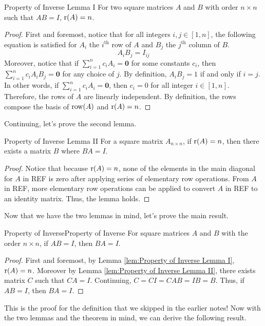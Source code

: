 \documentclass[../main.tex]{subfiles}
\begin{document}
\begin{lemma}{}{Property of Inverse Lemma I}
For two square matrices $A$ and $B$ with order $n \times n$ such that
$AB = I$, $\operatorname{r}(A) = n$.
\end{lemma}
\begin{proof}
First and foremost, notice that for all integers $i, j \in [1, n]$,
the following equation is satisfied for $A_i$ the $i^\text{th}$ row of
$A$ and $B_j$ the $j^\text{th}$ column of $B$.
\[
A_i B_j = I_{ij}
\]
Moreover, notice that if $\sum_{i=1}^n c_i A_i = \mathbf{0}$ for some
constants $c_i$, then $\sum_{i=1}^n c_i A_i B_j = \mathbf{0}$ for
any choice of $j$. By definition, $A_i B_j = 1$ if and only if
$i = j$. In other words, if $\sum_{i=1}^n c_i A_i = \mathbf{0}$, then
$c_i = 0$ for all integer $i \in [1, n]$. Therefore, the rows of $A$
are linearly independent. By definition, the rows compose the basis of
$\operatorname{row}(A)$ and $\operatorname{r}(A) = n$.
\end{proof}

Continuing, let's prove the second lemma.

\begin{lemma}{}{Property of Inverse Lemma II}
For a square matrix $A_{n \times n}$, if $\operatorname{r}(A) = n$, then there
exists a matrix $B$ where $BA = I$.
\end{lemma}
\begin{proof}
Notice that because $\operatorname{r}(A) = n$, none of the elements in the main
diagonal for $A$ in REF is zero after applying series of elementary
row operations. From $A$ in REF, more elementary row operations can
be applied to convert $A$ in REF to an identity matrix. Thus, the
lemma holds.
\end{proof}

Now that we have the two lemmas in mind, let's prove the main result.

\begin{theorem}{Property of Inverse}{Property of Inverse}
For square matrices $A$ and $B$ with the order $n \times n$, if
$AB = I$, then $BA = I$.
\end{theorem}
\begin{proof}
First and foremost, by Lemma \ref{lem:Property of Inverse Lemma I},
$\operatorname{r}(A) = n$. Moreover by Lemma \ref{lem:Property of Inverse Lemma
II}, there exists matrix $C$ such that $CA = I$. Continuing, $C = CI =
CAB = IB = B$. Thus, if $AB = I$, then $BA = I$.
\end{proof}

This is the proof for the definition that we skipped in the earlier
notes! Now with the two lemmas and the theorem in mind, we can
derive the following result.
\end{document}
